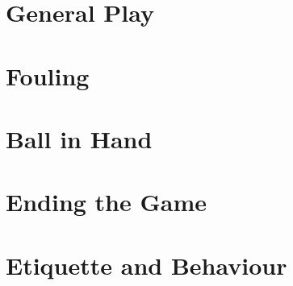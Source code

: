 \section{General Play} \label{9ball:general}

\section{Fouling} \label{9ball:fouling}

\section{Ball in Hand} \label{9ball:ballinhand}

\section{Ending the Game} \label{9ball:ending}

\section{Etiquette and Behaviour} \label{9ball:etiquette}









